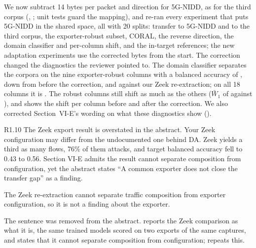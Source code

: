 \action We now subtract 14 bytes per packet and direction for 5G-NIDD, as for the third corpus (, ; unit tests guard the mapping), and re-ran every experiment that puts 5G-NIDD in the shared space, all with 20 splits: transfer to 5G-NIDD and to the third corpus, the exporter-robust subset, CORAL, the reverse direction, the domain classifier and per-column shift, and the in-target references; the new adaptation experiments use the corrected bytes from the start. The correction changed the diagnostics the reviewer pointed to. The domain classifier separates the corpora on the nine exporter-robust columns with a balanced accuracy of \RDomArgRobust, down from \RDomOldRobust{} before the correction, and \RDomZkRobust{} against our Zeek re-extraction; on all 18 columns it is \RDomArgShared. The robust columns still shift as much as the others ($\bar{W}_1$ of \RWoneArgRobust{} against \RWoneArgNonrobust), and  shows the shift per column before and after the correction. We also corrected Section~VI-E's wording on what these diagnostics show ().

\label{rv:R1.10}
\begin{concern}{R1.10}
The Zeek export result is overstated in the abstract. Your Zeek configuration may differ from the undocumented one behind DA. Zeek yields a third as many flows, 76\% of them attacks, and target balanced accuracy fell to 0.43 to 0.56. Section VI-E admits the result cannot separate composition from configuration, yet the abstract states ``A common exporter does not close the transfer gap'' as a finding.
\end{concern}
\response The Zeek re-extraction cannot separate traffic composition from exporter configuration, so it is not a finding about the exporter.

\action The sentence was removed from the abstract.  reports the Zeek comparison as what it is, the same trained models scored on two exports of the same captures, and states that it cannot separate composition from configuration;  repeats this.

